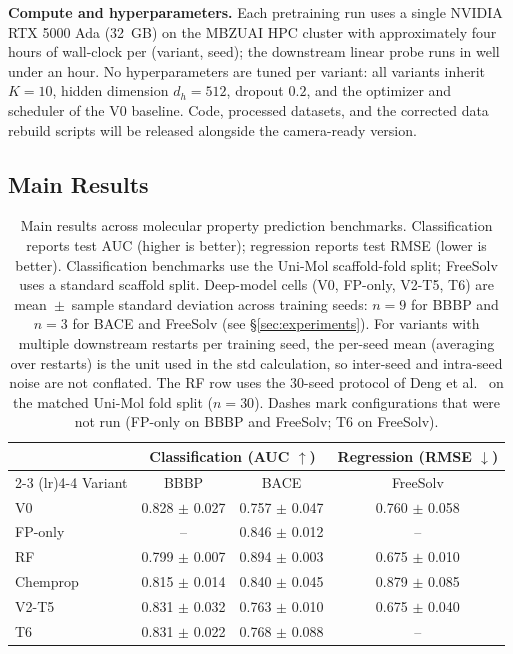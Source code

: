 \documentclass[conference]{IEEEtran}
\begin{document}
\noindent\textbf{Compute and hyperparameters.} Each pretraining run uses a single NVIDIA RTX 5000 Ada (32~GB) on the MBZUAI HPC cluster with approximately four hours of wall-clock per (variant, seed); the downstream linear probe runs in well under an hour. No hyperparameters are tuned per variant: all variants inherit $K{=}10$, hidden dimension $d_h{=}512$, dropout $0.2$, and the optimizer and scheduler of the V0 baseline. Code, processed datasets, and the corrected data rebuild scripts will be released alongside the camera-ready version.

\subsection{Main Results}

\begin{table}[t]
\caption{Main results across molecular property prediction benchmarks. Classification reports test AUC (higher is better); regression reports test RMSE (lower is better). Classification benchmarks use the Uni-Mol scaffold-fold split; FreeSolv uses a standard scaffold split. Deep-model cells (V0, FP-only, V2-T5, T6) are mean~$\pm$~sample standard deviation across training seeds: $n{=}9$ for BBBP and $n{=}3$ for BACE and FreeSolv (see \S\ref{sec:experiments}). For variants with multiple downstream restarts per training seed, the per-seed mean (averaging over restarts) is the unit used in the std calculation, so inter-seed and intra-seed noise are not conflated. The RF row uses the 30-seed protocol of Deng et al.~\cite{deng2023systematic} on the matched Uni-Mol fold split ($n{=}30$). Dashes mark configurations that were not run (FP-only on BBBP and FreeSolv; T6 on FreeSolv).}
\label{tab:main}
\centering
\begin{tabular}{lccc}
\toprule
 & \multicolumn{2}{c}{Classification (AUC $\uparrow$)} & Regression (RMSE $\downarrow$) \\
\cmidrule(lr){2-3} \cmidrule(lr){4-4}
Variant & BBBP & BACE & FreeSolv \\
\midrule
V0 & 0.828 $\pm$ 0.027 & 0.757 $\pm$ 0.047 & 0.760 $\pm$ 0.058 \\
FP-only & -- & 0.846 $\pm$ 0.012 & -- \\
RF & 0.799 $\pm$ 0.007 & 0.894 $\pm$ 0.003 & 0.675 $\pm$ 0.010 \\
Chemprop & 0.815 $\pm$ 0.014 & 0.840 $\pm$ 0.045 & 0.879 $\pm$ 0.085 \\
V2-T5 & 0.831 $\pm$ 0.032 & 0.763 $\pm$ 0.010 & 0.675 $\pm$ 0.040 \\
T6 & 0.831 $\pm$ 0.022 & 0.768 $\pm$ 0.088 & -- \\
\bottomrule
\end{tabular}
\end{table}
\end{document}
